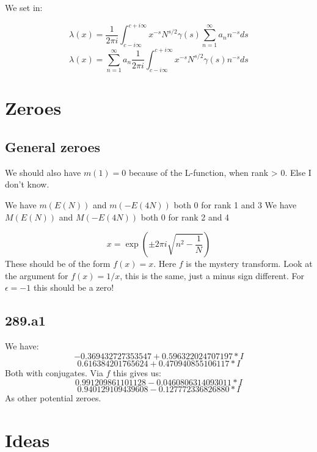 \documentclass[a4paper]{amsart}
\begin{document}
We set in:

$$\lambda(x) = \frac{1}{2\pi i} \int_{c - i\infty}^{c + i\infty} x^{-s} N^{s/2} \gamma(s) \sum_{n = 1}^{\infty} a_n n^{-s} ds$$
$$\lambda(x) = \sum_{n = 1}^{\infty} a_n \frac{1}{2\pi i} \int_{c - i\infty}^{c + i\infty} x^{-s} N^{s/2} \gamma(s) n^{-s} ds$$


\section{Zeroes}

\subsection{General zeroes}

We should also have $m(1) = 0$ because of the L-function, when rank > 0. Else I don't know.

We have $m(E(N))$ and $m(-E(4N))$ both $0$ for rank 1 and 3
We have $M(E(N))$ and $M(-E(4N))$ both $0$ for rank 2 and 4


$$x = \exp(\pm 2\pi i\sqrt{n^2 - \frac{1}{N}})$$
These should be of the form $f(x) = x$. Here $f$ is the mystery transform. Look at the argument for $f(x) = 1/x$, this is the same, just a minus sign different. For $\epsilon = -1$ this should be a zero!

\subsection{289.a1}

We have:
$$-0.369432727353547 + 0.596322024707197*I$$
$$0.616384201765624 + 0.470940855106117*I$$
Both with conjugates.
Via $f$ this gives us:
$$0.991209861101128 - 0.0460806314093011*I$$
$$0.940129109439608 - 0.127772336826880*I$$
As other potential zeroes.



\section{Ideas}
\end{document}
